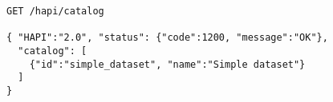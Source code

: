 \begin{verbatim}
GET /hapi/catalog

{ "HAPI":"2.0", "status": {"code":1200, "message":"OK"},
  "catalog": [
    {"id":"simple_dataset", "name":"Simple dataset"}
  ]
}
\end{verbatim}
